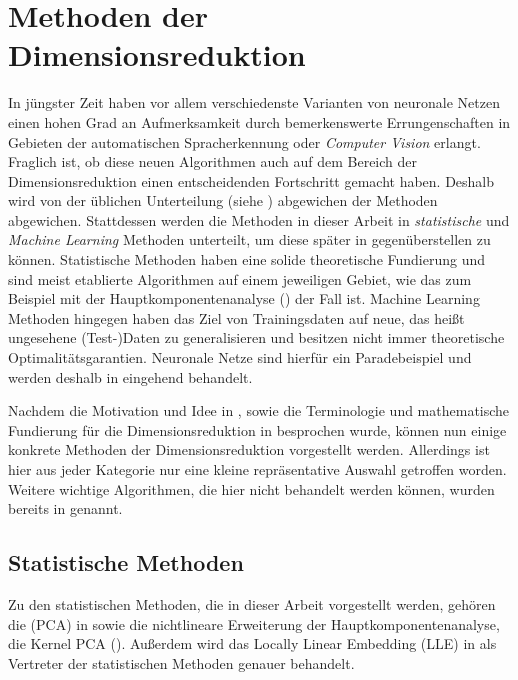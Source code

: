 \chapter{Methoden der Dimensionsreduktion}
\label{ch:MethodenDerDimRed}
In jüngster Zeit haben vor allem verschiedenste Varianten von neuronale Netzen einen hohen Grad an
Aufmerksamkeit durch bemerkenswerte Errungenschaften in Gebieten der automatischen Spracherkennung
oder \textit{Computer Vision} erlangt. Fraglich ist, ob diese neuen Algorithmen auch auf dem
Bereich der Dimensionsreduktion einen entscheidenden Fortschritt gemacht haben. Deshalb wird von
der üblichen Unterteilung (siehe ) abgewichen der Methoden
abgewichen. Stattdessen werden die Methoden in dieser Arbeit in \textit{statistische} und
\textit{Machine Learning} Methoden unterteilt, um diese später in 
gegenüberstellen zu können. Statistische Methoden haben eine solide theoretische Fundierung und
sind meist etablierte Algorithmen auf einem jeweiligen Gebiet, wie das zum Beispiel mit der
Hauptkomponentenanalyse () der Fall ist. Machine
Learning Methoden hingegen haben das Ziel von Trainingsdaten auf neue, das heißt ungesehene
(Test-)Daten zu generalisieren und besitzen nicht immer theoretische Optimalitätsgarantien.
Neuronale Netze sind hierfür ein Paradebeispiel und werden deshalb in
 eingehend behandelt.

Nachdem die Motivation und Idee in , sowie die Terminologie und mathematische
Fundierung für die Dimensionsreduktion in  besprochen wurde, können
nun einige konkrete Methoden der Dimensionsreduktion vorgestellt werden. Allerdings ist hier aus
jeder Kategorie nur eine kleine repräsentative Auswahl getroffen worden. Weitere wichtige
Algorithmen, die hier nicht behandelt werden können, wurden bereits in
 genannt.

\section{Statistische Methoden}
\label{ch:MethodenDerDimRed:statistisch}

Zu den statistischen Methoden, die in dieser Arbeit vorgestellt werden, gehören die
 (PCA) in  sowie
die nichtlineare Erweiterung der Hauptkomponentenanalyse, die Kernel PCA
(). Außerdem wird das Locally Linear Embedding
(LLE) in  als Vertreter der statistischen Methoden
genauer behandelt.

